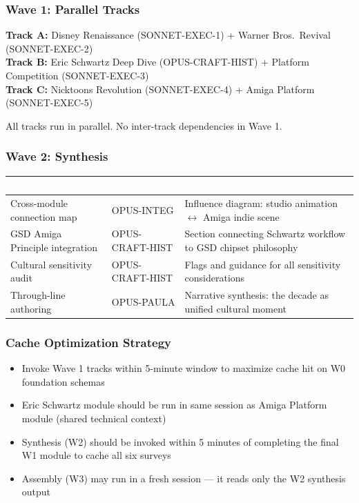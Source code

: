 \documentclass[11pt,letterpaper]{article}
\newcommand{\tableheader}[1]{\textbf{\sffamily\textcolor{white}{#1}}}
\begin{document}
\subsubsection{Wave 1: Parallel Tracks}

\textbf{Track A:} Disney Renaissance (SONNET-EXEC-1) + Warner Bros.\ Revival (SONNET-EXEC-2)\\
\textbf{Track B:} Eric Schwartz Deep Dive (OPUS-CRAFT-HIST) + Platform Competition (SONNET-EXEC-3)\\
\textbf{Track C:} Nicktoons Revolution (SONNET-EXEC-4) + Amiga Platform (SONNET-EXEC-5)

All tracks run in parallel. No inter-track dependencies in Wave 1.

\subsubsection{Wave 2: Synthesis}

\begin{center}
\begin{tabularx}{\textwidth}{L{4cm}L{2cm}X}
\toprule
{}
\tableheader{Task} & \tableheader{Agent} & \tableheader{Output} \\
\midrule
Cross-module connection map & OPUS-INTEG & Influence diagram: studio animation $\leftrightarrow$ Amiga indie scene \\
GSD Amiga Principle integration & OPUS-CRAFT-HIST & Section connecting Schwartz workflow to GSD chipset philosophy \\
Cultural sensitivity audit & OPUS-CRAFT-HIST & Flags and guidance for all sensitivity considerations \\
Through-line authoring & OPUS-PAULA & Narrative synthesis: the decade as unified cultural moment \\
\bottomrule
\end{tabularx}
\end{center}

\subsubsection{Cache Optimization Strategy}

\begin{itemize}[leftmargin=2em]
  \item Invoke Wave 1 tracks within 5-minute window to maximize cache hit on W0 foundation schemas
  \item Eric Schwartz module should be run in same session as Amiga Platform module (shared technical context)
  \item Synthesis (W2) should be invoked within 5 minutes of completing the final W1 module to cache all six surveys
  \item Assembly (W3) may run in a fresh session --- it reads only the W2 synthesis output
\end{itemize}
\end{document}
